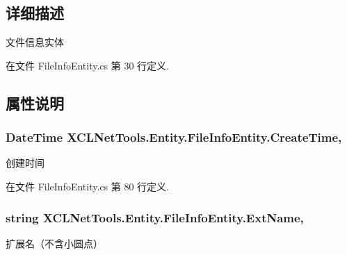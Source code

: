 \subsection{详细描述}
文件信息实体 



在文件 File\-Info\-Entity.\-cs 第 30 行定义.



\subsection{属性说明}
\hypertarget{class_x_c_l_net_tools_1_1_entity_1_1_file_info_entity_a93fc7b2a3119885d9449d1817e7306ca}{
\subsubsection[{Create\-Time}]{\setlength{\rightskip}{0pt plus 5cm}Date\-Time X\-C\-L\-Net\-Tools.\-Entity.\-File\-Info\-Entity.\-Create\-Time\hspace{0.3cm}{\ttfamily [get]}, {\ttfamily [set]}}}\label{class_x_c_l_net_tools_1_1_entity_1_1_file_info_entity_a93fc7b2a3119885d9449d1817e7306ca}


创建时间 



在文件 File\-Info\-Entity.\-cs 第 80 行定义.

\hypertarget{class_x_c_l_net_tools_1_1_entity_1_1_file_info_entity_a46ccaf5dbcc1154782c0227c83eb54e4}{
\subsubsection[{Ext\-Name}]{\setlength{\rightskip}{0pt plus 5cm}string X\-C\-L\-Net\-Tools.\-Entity.\-File\-Info\-Entity.\-Ext\-Name\hspace{0.3cm}{\ttfamily [get]}, {\ttfamily [set]}}}\label{class_x_c_l_net_tools_1_1_entity_1_1_file_info_entity_a46ccaf5dbcc1154782c0227c83eb54e4}


扩展名（不含小圆点） 



